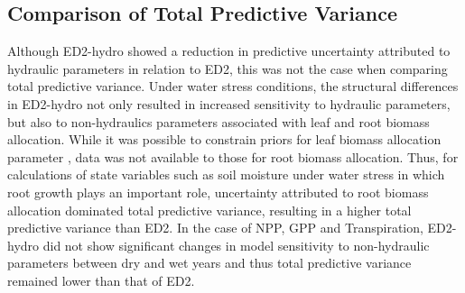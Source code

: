 

\subsection*{Comparison of Total Predictive Variance}

Although ED2-hydro showed a reduction in predictive uncertainty attributed  to hydraulic parameters in relation to ED2, this was not the case when comparing total predictive variance. Under water stress conditions, the structural differences in ED2-hydro not only resulted in increased sensitivity to hydraulic parameters, but also to non-hydraulics parameters associated with leaf and root biomass allocation. While it was possible to constrain priors for leaf biomass allocation parameter , data was not available to those for root biomass allocation.  Thus, for calculations of state variables such as soil moisture under water stress in which root growth plays an important role, uncertainty attributed to root biomass allocation dominated total predictive variance, resulting in a higher total predictive variance than ED2. In the case of NPP, GPP and Transpiration, ED2-hydro did not show significant changes in model sensitivity to non-hydraulic parameters between dry and wet years and thus total predictive variance remained lower than that of ED2. 





